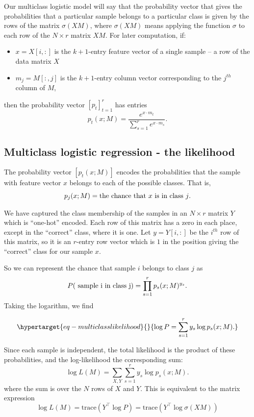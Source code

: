 \documentclass[
  11pt,
  letterpaper,
]{scrbook}
\providecommand{\tightlist}{%
  \setlength{\itemsep}{0pt}\setlength{\parskip}{0pt}}\usepackage{longtable,booktabs,array}
\theoremstyle{plain}
\theoremstyle{remark}
\begin{document}
Our multiclass logistic model will say that the probability vector that
gives the probabilities that a particular sample belongs to a particular
class is given by the rows of the matrix \(\sigma(XM)\), where
\(\sigma(XM)\) means applying the function \(\sigma\) to each row of the
\(N\times r\) matrix \(XM\). For later computation, if:

\begin{itemize}
\tightlist
\item
  \(x=X[i,:]\) is the \(k+1\)-entry feature vector of a single sample --
  a row of the data matrix \(X\)
\item
  \(m_{j}=M[:,j]\) is the \(k+1\)-entry column vector corresponding to
  the \(j^{th}\) column of \(M\),
\end{itemize}

then the probability vector \([p_{t}]_{t=1}^{r}\) has entries \[
p_{t}(x;M) = \frac{e^{x\cdot m_{t}}}{\sum_{s=1}^{r} e^{x\cdot m_{s} }}.
\]

\hypertarget{multiclass-logistic-regression---the-likelihood}{%
\subsection{Multiclass logistic regression - the
likelihood}\label{multiclass-logistic-regression---the-likelihood}}

The probability vector \([p_{t}(x;M)]\) encodes the probabilities that
the sample with feature vector \(x\) belongs to each of the possible
classes. That is, \[
p_{j}(x;M)=\hbox{the chance that $x$ is in class $j$}.
\]

We have captured the class membership of the samples in an \(N\times r\)
matrix \(Y\) which is ``one-hot'' encoded. Each row of this matrix has a
zero in each place, except in the ``correct'' class, where it is one.
Let \(y=Y[i,:]\) be the \(i^{th}\) row of this matrix, so it is an
\(r\)-entry row vector which is \(1\) in the position giving the
``correct'' class for our sample \(x\).

So we can represent the chance that sample \(i\) belongs to class \(j\)
as \[
P(\hbox{ sample i in class j})=\prod_{s=1}^{r} p_{s}(x;M)^{y_{s}}.
\] Taking the logarithm, we find

\begin{equation}\protect\hypertarget{eq-multiclasslikelihood}{}{
\log P = \sum_{s=1}^{r} y_{s}\log p_{s}(x;M).
}\label{eq-multiclasslikelihood}\end{equation}

Since each sample is independent, the total likelihood is the product of
these probabilities, and the log-likelihood the corresponding sum: \[
\log L(M) = \sum_{X,Y} \sum_{s=1}^{r} y_{s}\log p_{s}(x;M).
\] where the sum is over the \(N\) rows of \(X\) and \(Y\). This is
equivalent to the matrix expression \[
\log L(M) = \mathrm{trace}(Y^{\intercal}\log P)=\mathrm{trace}(Y^{\intercal}\log\sigma(XM))
\]
\end{document}
